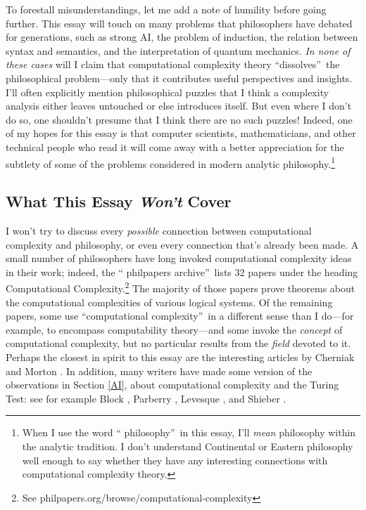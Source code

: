 \documentclass[12pt,onecolumn]{article}%
\begin{document}
To forestall misunderstandings, let me add a note of humility before going
further. This essay will touch on many problems that philosophers have debated
for generations, such as strong AI, the problem of induction, the relation
between syntax and semantics, and the interpretation of quantum mechanics.
 \textit{In none of these cases} will I claim that computational complexity
theory \textquotedblleft dissolves\textquotedblright\  the philosophical
problem---only that it contributes useful perspectives and insights. I'll
often explicitly mention philosophical puzzles that I think a complexity
analysis either leaves untouched or else introduces itself. But even where I
don't do so, one shouldn't presume that I think there are no such puzzles!
 Indeed, one of my hopes for this essay is that computer scientists,
mathematicians, and other technical people who read it will come away with a
better appreciation for the subtlety of some of the problems considered in
modern analytic philosophy.\footnote{When I use the word \textquotedblleft
philosophy\textquotedblright\  in this essay, I'll \textit{mean} philosophy
within the analytic tradition. I don't understand Continental or Eastern
philosophy well enough to say whether they have any interesting connections
with computational complexity theory.}

\subsection{What This Essay \textit{Won't} Cover\label{WONT}}

I won't try to discuss every \textit{possible} connection between
computational complexity and philosophy, or even every connection that's
already been made. A small number of philosophers have long invoked
computational complexity ideas in their work; indeed, the \textquotedblleft
philpapers archive\textquotedblright\  lists $32$ papers under the heading
Computational Complexity.\footnote{See
philpapers.org/browse/computational-complexity} The majority of those papers
prove theorems about the computational complexities of various logical
systems. Of the remaining papers, some use \textquotedblleft computational
complexity\textquotedblright\  in a different sense than I do---for example, to
encompass computability theory---and some invoke the \textit{concept} of
computational complexity, but no particular results from the \textit{field}
devoted to it. Perhaps the closest in spirit to this essay are the
interesting articles by Cherniak \cite{cherniak} and Morton \cite{morton}.
 In addition, many writers have made some version of the observations in
Section \ref{AI}, about computational complexity and the Turing Test: see for
example Block \cite{block}, Parberry \cite{parberry}, Levesque \cite{levesque}%
, and Shieber \cite{shieber}.
\end{document}
